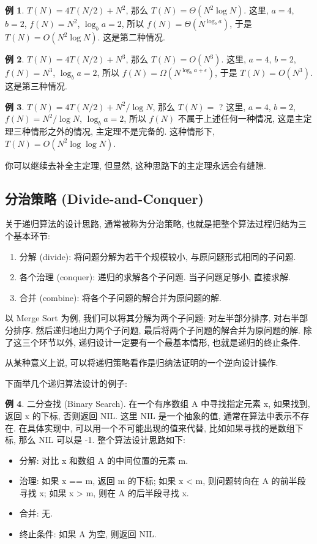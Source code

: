 \documentclass[a4paper]{ctexart}
\theoremstyle{definition}
\theoremstyle{definition}
\newtheorem{example}{例}[section]
\begin{document}
\begin{example}
$T(N) = 4 T(N / 2) + N^2$, 那么 $T(N) = \Theta(N^2\log N)$.
  这里, $a = 4$, $b = 2$, $f(N) = N^2$, $\log_b a = 2$, 所以 $f(N) = \Theta(N^{\log_b a})$, 于是 $T(N) = O(N^2 \log N)$. 这是第二种情况.
\end{example}

\begin{example}
$T(N) = 4 T(N / 2) + N^3$, 那么 $T(N) = O(N^3)$.
  这里, $a = 4$, $b = 2$, $f(N) = N^3$, $\log_b a = 2$, 所以 $f(N) = \Omega(N^{\log_b a + \epsilon})$, 于是 $T(N) = O(N^3)$. 这是第三种情况.
\end{example}

\begin{example}
$T(N) = 4 T(N / 2) + N^2 / \log N$, 那么 $T(N) = $ ?  
  这里, $a = 4$, $b = 2$, $f(N) = N^2 / \log N$, $\log_b a = 2$, 所以 $f(N)$ 不属于上述任何一种情况, 这是主定理三种情形之外的情况, 
  主定理不是完备的. 这种情形下, 
  $T(N) = O(N^2 \log \log N)$. 
\end{example}

你可以继续去补全主定理, 但显然, 这种思路下的主定理永远会有缝隙. 

\subsection{分治策略 (Divide-and-Conquer)}

关于递归算法的设计思路, 通常被称为分治策略, 也就是把整个算法过程归结为三个基本环节: 
\begin{enumerate}
  \item 分解 (divide): 将问题分解为若干个规模较小, 与原问题形式相同的子问题.
  \item 各个治理 (conquer): 递归的求解各个子问题. 当子问题足够小, 直接求解.
  \item 合并 (combine): 将各个子问题的解合并为原问题的解.
\end{enumerate}
以 Merge Sort 为例, 我们可以将其分解为两个子问题: 对左半部分排序, 对右半部分排序. 然后递归地出力两个子问题, 
最后将两个子问题的解合并为原问题的解. 除了这三个环节以外, 递归设计一定要有一个最基本情形, 也就是递归的终止条件. 

从某种意义上说, 可以将递归策略看作是归纳法证明的一个逆向设计操作.

下面举几个递归算法设计的例子: 

\begin{example}
  二分查找 (Binary Search). 在一个有序数组 A 中寻找指定元素 x, 如果找到, 返回 x 的下标, 否则返回 NIL. 这里 NIL 是一个抽象的值, 
  通常在算法中表示不存在. 在具体实现中, 可以用一个不可能出现的值来代替, 比如如果寻找的是数组下标, 那么 NIL 可以是 -1. 整个算法设计思路如下: 
  \begin{itemize}
    \item 分解: 对比 x 和数组 A 的中间位置的元素 m.
    \item 治理: 如果 x == m, 返回 m 的下标; 如果 x < m, 则问题转向在 A 的前半段寻找 x; 如果 x > m, 则在 A 的后半段寻找 x.
    \item 合并: 无.
    \item 终止条件: 如果 A 为空, 则返回 NIL. 
  \end{itemize}
\end{example}
\end{document}
